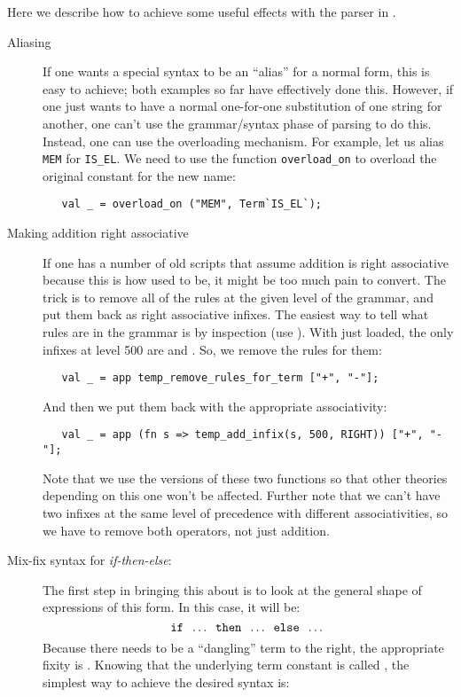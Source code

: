 {Here we describe how to achieve some useful effects with the
parser in \HOL{}.

\begin{description}

\item[Aliasing] If one wants a special syntax to be an ``alias'' for a
  normal \HOL{} form, this is easy to achieve; both examples so far
  have effectively done this.  However, if one just wants to have a
  normal one-for-one substitution of one string for another, one can't
  use the grammar/syntax phase of parsing to do this.  Instead, one
  can use the overloading mechanism.  For example, let us alias
  \texttt{MEM} for \texttt{IS\_EL}.  We need to use the function
  \texttt{overload\_on} to overload the original constant for the new
  name:
\begin{verbatim}
   val _ = overload_on ("MEM", Term`IS_EL`);
\end{verbatim}

\item[Making addition right associative] If one has a number of old
  scripts that assume addition is right associative because this is
  how \HOL{} used to be, it might be too much pain to convert.  The trick
  is to remove all of the rules at the given level of the grammar, and
  put them back as right associative infixes.  The easiest way to tell
  what rules are in the grammar is by inspection (use
  ).  With just 
  loaded, the only infixes at level 500 are \holtxt{+} and
  \holtxt{-}.  So, we remove the rules for them:
\begin{verbatim}
   val _ = app temp_remove_rules_for_term ["+", "-"];
\end{verbatim}
  \noindent And then we put them back with the appropriate
  associativity:
\begin{verbatim}
   val _ = app (fn s => temp_add_infix(s, 500, RIGHT)) ["+", "-"];
\end{verbatim}
\noindent Note that we use the  versions of these two
functions so that other theories depending on this one won't be
affected.  Further note that we can't have two infixes at the same
level of precedence with different associativities, so we have to
remove both operators, not just addition.

\item[Mix-fix syntax for {\it if-then-else}:]
%
The first step in bringing this about is to look at the general shape
of expressions of this form.  In this case, it will be:
%
\[
  \holtxt{if}\;\; \dots \;\;\holtxt{then}\;\;\dots\;\;
  \holtxt{else}\;\;\dots
  \]
%
 Because there needs to be a ``dangling'' term to the right, the
  appropriate fixity is .  Knowing that the underlying
  term constant is called , the simplest way to achieve
  the desired syntax is:


\end{description}}
